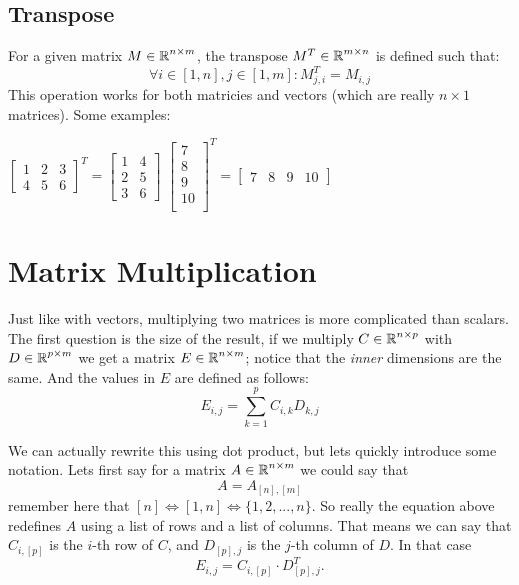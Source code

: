 \subsection{Transpose} 
For a given matrix $M \in \operatorname{\mathbb{R}}^{n\times m}$, the transpose $M^T \in \operatorname{\mathbb{R}}^{m \times n}$ is defined such that:
\[
\forall i\in[1,n], j\in[1,m] : M^T_{j,i} = M_{i,j} 
\]
This operation works for both matricies and vectors (which are really $n\times1$ matrices).
Some examples: 
\begin{center}
$\left[\begin{matrix}
1 & 2 & 3\\
4 & 5 & 6
\end{matrix}\right]^T = 
\left[\begin{matrix}
1 & 4 \\
2 & 5 \\
3 & 6
\end{matrix}\right]$%
\hspace{5em}
$\left[\begin{matrix}
7 \\
8 \\
9 \\
10 \\
\end{matrix}\right]^T = \left[\begin{matrix}
7 & 8 & 9 & 10
\end{matrix}\right]
$
\end{center}
\section{Matrix Multiplication}
Just like with vectors, multiplying two matrices is more complicated than scalars. 
The first question is the size of the result, if we multiply $C \in \operatorname{\mathbb{R}}^{n\times p}$ with $D \in \operatorname{\mathbb{R}}^{p\times m}$ we get a matrix $E \in \operatorname{\mathbb{R}}^{n\times m}$;
notice that the \textit{inner} dimensions are the same.
And the values in $E$ are defined as follows:
\[
E_{i,j} = \sum_{k=1}^p C_{i,k}D_{k,j}
\]

We can actually rewrite this using dot product, but lets quickly introduce some notation.
Lets first say for a matrix $A\in\operatorname{\mathbb{R}}^{n\times m}$ we could say that 
\[A = A_{[n],[m]}\] 
remember here that $[n] \iff [1,n] \iff \{1,2,...,n\}$. 
So really the equation above redefines $A$ using a list of rows and a list of columns. 
That means we can say that $C_{i,[p]}$ is the $i$-th row of $C$, and $D_{[p],j}$ is the $j$-th column of $D$.
In that case \[E_{i,j} = C_{i,[p]}\cdot D_{[p],j}^T.\]

